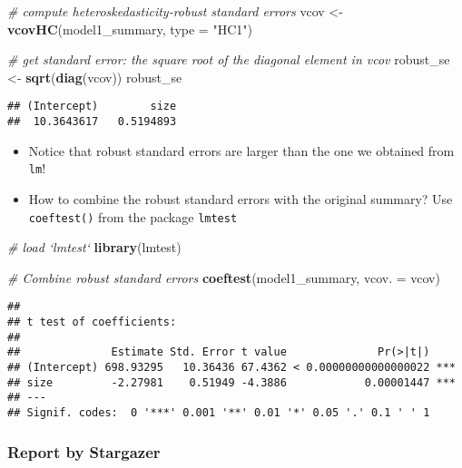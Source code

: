 \documentclass[]{book}
\newenvironment{Shaded}{\begin{snugshade}}{\end{snugshade}}
\newcommand{\KeywordTok}[1]{\textcolor[rgb]{0.13,0.29,0.53}{\textbf{#1}}}
\newcommand{\DataTypeTok}[1]{\textcolor[rgb]{0.13,0.29,0.53}{#1}}
\newcommand{\StringTok}[1]{\textcolor[rgb]{0.31,0.60,0.02}{#1}}
\newcommand{\CommentTok}[1]{\textcolor[rgb]{0.56,0.35,0.01}{\textit{#1}}}
\newcommand{\NormalTok}[1]{#1}
\providecommand{\tightlist}{%
  \setlength{\itemsep}{0pt}\setlength{\parskip}{0pt}}
\begin{document}
\begin{Shaded}
\begin{Highlighting}[]
\CommentTok{# compute heteroskedasticity-robust standard errors}
\NormalTok{vcov <-}\StringTok{ }\KeywordTok{vcovHC}\NormalTok{(model1_summary, }\DataTypeTok{type =} \StringTok{"HC1"}\NormalTok{)}

\CommentTok{# get standard error: the square root of the diagonal element in vcov}
\NormalTok{robust_se <-}\StringTok{ }\KeywordTok{sqrt}\NormalTok{(}\KeywordTok{diag}\NormalTok{(vcov))}
\NormalTok{robust_se}
\end{Highlighting}
\end{Shaded}

\begin{verbatim}
## (Intercept)        size 
##  10.3643617   0.5194893
\end{verbatim}

\begin{itemize}
\tightlist
\item
  Notice that robust standard errors are larger than the one we obtained
  from \texttt{lm}!
\item
  How to combine the robust standard errors with the original summary?
  Use \texttt{coeftest()} from the package \texttt{lmtest}
\end{itemize}

\begin{Shaded}
\begin{Highlighting}[]
\CommentTok{# load `lmtest`}
\KeywordTok{library}\NormalTok{(lmtest)}

\CommentTok{# Combine robust standard errors}
\KeywordTok{coeftest}\NormalTok{(model1_summary, }\DataTypeTok{vcov. =}\NormalTok{ vcov)}
\end{Highlighting}
\end{Shaded}

\begin{verbatim}
## 
## t test of coefficients:
## 
##              Estimate Std. Error t value              Pr(>|t|)    
## (Intercept) 698.93295   10.36436 67.4362 < 0.00000000000000022 ***
## size         -2.27981    0.51949 -4.3886            0.00001447 ***
## ---
## Signif. codes:  0 '***' 0.001 '**' 0.01 '*' 0.05 '.' 0.1 ' ' 1
\end{verbatim}

\subsubsection{Report by Stargazer}\label{report-by-stargazer}
\end{document}

